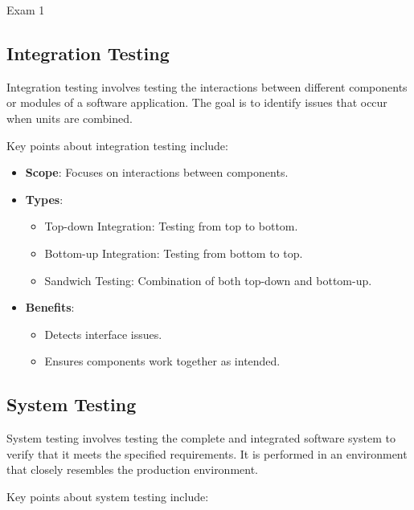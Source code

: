 \begin{examnotes}{Exam 1}
    \subsection*{Integration Testing}
    
    Integration testing involves testing the interactions between different components or modules of a software application. The goal is to identify issues that occur when units are combined.
    
    \begin{highlight}
        Key points about integration testing include:
        
        \begin{itemize}
            \item \textbf{Scope}: Focuses on interactions between components.
            \item \textbf{Types}:
                \begin{itemize}
                    \item Top-down Integration: Testing from top to bottom.
                    \item Bottom-up Integration: Testing from bottom to top.
                    \item Sandwich Testing: Combination of both top-down and bottom-up.
                \end{itemize}
            \item \textbf{Benefits}:
                \begin{itemize}
                    \item Detects interface issues.
                    \item Ensures components work together as intended.
                \end{itemize}
        \end{itemize}
    \end{highlight}
    
    \subsection*{System Testing}
    
    System testing involves testing the complete and integrated software system to verify that it meets the specified requirements. It is performed in an environment that closely resembles the production environment.
    
    \begin{highlight}
        Key points about system testing include:
        

\end{highlight}
\end{examnotes}
